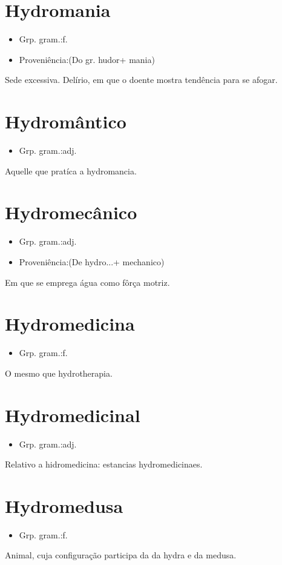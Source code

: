 \documentclass{article}
\begin{document}
\section{Hydromania}
\begin{itemize}
\item {Grp. gram.:f.}
\end{itemize}
\begin{itemize}
\item {Proveniência:(Do gr. \textunderscore hudor\textunderscore  + \textunderscore mania\textunderscore )}
\end{itemize}
Sede excessiva.
Delírio, em que o doente mostra tendência para se afogar.
\section{Hydromântico}
\begin{itemize}
\item {Grp. gram.:adj.}
\end{itemize}
Aquelle que pratíca a hydromancia.
\section{Hydromecânico}
\begin{itemize}
\item {Grp. gram.:adj.}
\end{itemize}
\begin{itemize}
\item {Proveniência:(De \textunderscore hydro...\textunderscore  + \textunderscore mechanico\textunderscore )}
\end{itemize}
Em que se emprega água como fôrça motriz.
\section{Hydromedicina}
\begin{itemize}
\item {Grp. gram.:f.}
\end{itemize}
O mesmo que \textunderscore hydrotherapia\textunderscore .
\section{Hydromedicinal}
\begin{itemize}
\item {Grp. gram.:adj.}
\end{itemize}
Relativo a hidromedicina: \textunderscore estancias hydromedicinaes\textunderscore .
\section{Hydromedusa}
\begin{itemize}
\item {Grp. gram.:f.}
\end{itemize}
Animal, cuja configuração participa da da hydra e da medusa.
\end{document}
